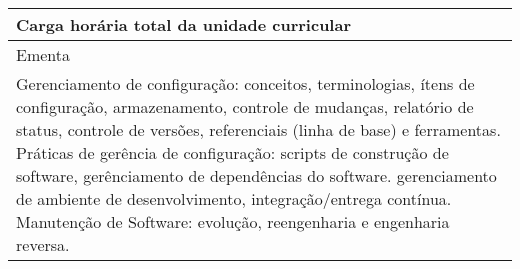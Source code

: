\begin{quadro}[h!]
\begin{tabular}{|p{3cm} p{2cm} p{3cm} p{2cm} p{3cm} p{2cm}|}
\multicolumn{5}{|p{13cm}|}{\cellcolor{blue1} Carga horária total da unidade curricular} & \multicolumn{1}{p{1cm}|}{\raggedleft 60	}\\\hline
\multicolumn{6}{|p{15cm}|}{\cellcolor{blue1} Ementa} \\\hline
\hline\multicolumn{6}{|p{15cm}|}{\scriptsize Gerenciamento de configuração: conceitos, terminologias, ítens de configuração, armazenamento, controle de mudanças, relatório de status, controle de versões, referenciais (linha de base) e ferramentas. Práticas de gerência de configuração: scripts de construção de software, gerênciamento de dependências do software. gerenciamento de ambiente de desenvolvimento, integração/entrega contínua. Manutenção de Software: evolução, reengenharia e engenharia reversa.}\\\hline
\hline
	\end{tabular}
\end{quadro}
